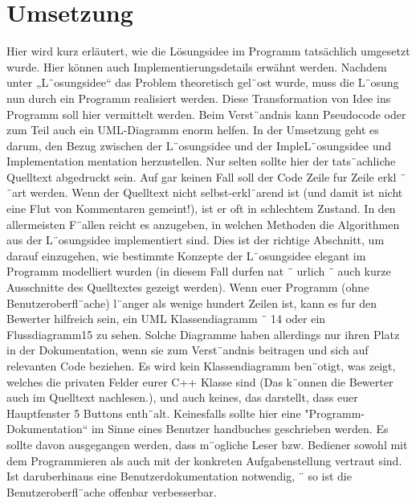 \documentclass[a4paper,10pt,ngerman]{scrartcl}
\begin{document}
    \section{Umsetzung}\label{sec:umsetzung}
    Hier wird kurz erläutert, wie die Lösungsidee im Programm tatsächlich umgesetzt wurde.
    Hier können auch Implementierungsdetails erwähnt werden.
    Nachdem unter „L¨osungsidee“ das Problem theoretisch gel¨ost wurde, muss die L¨osung nun durch ein Programm realisiert werden.
    Diese Transformation von Idee ins Programm soll hier vermittelt werden.
    Beim Verst¨andnis kann Pseudocode oder zum Teil auch ein UML-Diagramm enorm helfen.
    In der Umsetzung geht es darum, den Bezug zwischen der L¨osungsidee und der ImpleL¨osungsidee und
    Implementation mentation herzustellen.
    Nur selten sollte hier der tats¨achliche Quelltext abgedruckt sein.
    Auf gar keinen Fall soll der Code Zeile fur Zeile erkl ¨ ¨art werden.
    Wenn der Quelltext nicht selbst-erkl¨arend ist (und damit ist nicht eine Flut von Kommentaren gemeint!), ist er
    oft in schlechtem Zustand.
    In den allermeisten F¨allen reicht es anzugeben, in welchen
    Methoden die Algorithmen aus der L¨osungsidee implementiert sind.
    Dies ist der richtige Abschnitt, um darauf einzugehen, wie bestimmte Konzepte der
    L¨osungsidee elegant im Programm modelliert wurden (in diesem Fall durfen nat ¨ urlich ¨
    auch kurze Ausschnitte des Quelltextes gezeigt werden).
    Wenn euer Programm (ohne Benutzeroberfl¨ache) l¨anger als wenige hundert Zeilen ist,
    kann es fur den Bewerter hilfreich sein, ein UML Klassendiagramm ¨
    14 oder ein Flussdiagramm15 zu sehen.
    Solche Diagramme haben allerdings nur ihren Platz in der Dokumentation, wenn sie zum Verst¨andnis beitragen und sich auf relevanten Code beziehen. Es
    wird kein Klassendiagramm ben¨otigt, was zeigt, welches die privaten Felder eurer C++
    Klasse sind (Das k¨onnen die Bewerter auch im Quelltext nachlesen.), und auch keines,
    das darstellt, dass euer Hauptfenster 5 Buttons enth¨alt.
    Keinesfalls sollte hier eine "Programm-Dokumentation“ im Sinne eines Benutzer handbuches geschrieben werden.
    Es sollte davon ausgegangen werden, dass m¨ogliche
    Leser bzw.
    Bediener sowohl mit dem Programmieren als auch mit der konkreten Aufgabenstellung vertraut sind.
    Ist daruberhinaus eine Benutzerdokumentation notwendig, ¨
    so ist die Benutzeroberfl¨ache offenbar verbesserbar.
\end{document}
